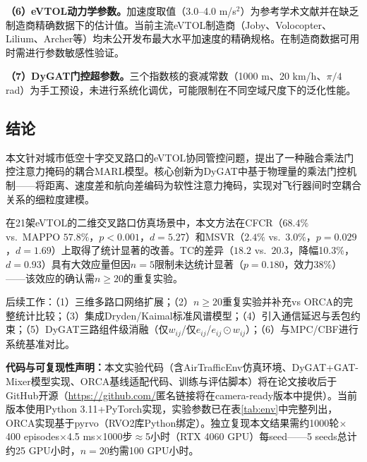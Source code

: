\documentclass[12pt,a4paper,UTF8]{ctexart}
\begin{document}
\textbf{（6）eVTOL动力学参数。}加速度取值（3.0--4.0 m/s$^2$）为参考学术文献\cite{ref25}并在缺乏制造商精确数据下的估计值。当前主流eVTOL制造商（Joby、Volocopter、Lilium、Archer等）均未公开发布最大水平加速度的精确规格。在制造商数据可用时需进行参数敏感性验证。

\textbf{（7）DyGAT门控超参数。}三个指数核的衰减常数（1000 m、20 km/h、$\pi/4$ rad）为手工预设，未进行系统化调优，可能限制在不同空域尺度下的泛化性能。

\subsection{结论}

本文针对城市低空十字交叉路口的eVTOL协同管控问题，提出了一种融合乘法门控注意力掩码的耦合MARL模型。核心创新为DyGAT中基于物理量的乘法门控机制——将距离、速度差和航向差编码为软性注意力掩码，实现对飞行器间时空耦合关系的细粒度建模。

在21架eVTOL的二维交叉路口仿真场景中，本文方法在CFCR（$68.4\%$ vs.\ MAPPO $57.8\%$，$p<0.001$，$d=5.27$）和MSVR（$2.4\%$ vs.\ $3.0\%$，$p=0.029$，$d=1.69$）上取得了统计显著的改善。TC的差异（$18.2$ vs.\ $20.3$，降幅10.3\%，$d=0.93$）具有大效应量但因$n=5$限制未达统计显著（$p=0.180$，效力38\%）——该效应的确认需$n\geq20$的重复实验。

后续工作：（1）三维多路口网络扩展；（2）$n\geq20$重复实验并补充vs ORCA的完整统计比较；（3）集成Dryden/Kaimal标准风谱模型；（4）引入通信延迟与丢包约束；（5）DyGAT三路组件级消融（仅$w_{ij}$/仅$e_{ij}$/$e_{ij}\odot w_{ij}$）；（6）与MPC/CBF进行系统基准对比。

\textbf{代码与可复现性声明：}本文实验代码（含AirTrafficEnv仿真环境、DyGAT+GAT-Mixer模型实现、ORCA基线适配代码、训练与评估脚本）将在论文接收后于GitHub开源（\url{https://github.com/}匿名链接将在camera-ready版本中提供）。当前版本使用Python 3.11+PyTorch实现，实验参数已在表\ref{tab:env}中完整列出，ORCA实现基于pyrvo（RVO2库Python绑定）。独立复现本文结果需约1000轮$\times$400 episodes$\times$4.5 ms$\times$1000步$\approx$5小时（RTX 4060 GPU）每seed——5 seeds总计约25 GPU小时，$n=20$约需100 GPU小时。
\end{document}
